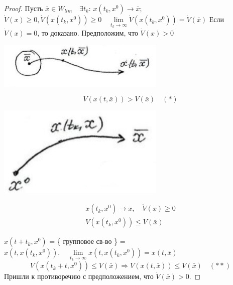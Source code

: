 	\begin{proof} \newline
		Пусть $\bar{x} \in W_{lim}\quad \exists t_k: \, x(t_k,x^0) \rightarrow \bar{x}$;
		$\dot{V}(x) \geqslant 0 , \dot{V}(x(t_k, x^0))\geqslant 0 \quad \lim\limits_{t_k\rightarrow \infty}
																\dot{V}(x(t_k, x^0)) = \dot{V}(\bar{x}) $ \newline
		Если $\dot{V}(x) = 0$, то доказано. \newline
		Предположим, что $\dot{V}(x) > 0$\newline
		\begin{minipage}{0.4\textwidth} \vspace{3mm}		
			\begin{center} \includegraphics[width=0.6\textwidth]{ch8/pict/pict_13_1.png} \vspace{5mm}\end{center} 
		\end{minipage} 
		\begin{minipage}{0.4\textwidth}	
			$$V(x(t,\bar{x})) > V(\bar{x})\quad (*)$$
		\end{minipage} 	
		\newline
		\begin{minipage}{0.4\textwidth} \vspace{3mm}		
			\begin{center} \includegraphics[width=0.6\textwidth]{ch8/pict/pict_13_2.png} \vspace{5mm}\end{center} 
		\end{minipage} 
		\begin{minipage}{0.4\textwidth}	
			$$\begin{gathered}  x(t_k,x^0) \rightarrow \bar{x}, \quad \dot{V}(x)\geqslant 0 \\
												 V(x(t_k, x^0)) \leqslant V(\bar{x}) \end{gathered}$$
		\end{minipage} \newline	
		$x(t+t_k,x^0)$ = \{ групповое св-во \} = $x(t, x(t_k,x^0)), \quad 
										\lim\limits_{t_k\rightarrow \infty} x(t,x(t_k,x^0)) = x(t,\bar{x})$
		$$
			V(x(t_k+t,x^0)) \leqslant V(\bar{x}) \Rightarrow V(x(t,\bar{x})) \leqslant V(\bar{x}) \quad (**)
		$$
		Пришли к противоречию с предположением, что $\dot{V}(\bar{x})>0$.
		
	\end{proof}
	
